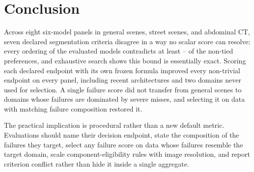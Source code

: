 \section{Conclusion}

Across eight six-model panels in general scenes, street scenes, and abdominal
CT, seven declared segmentation criteria disagree in a way no scalar score can
resolve: every ordering of the evaluated models contradicts at least
\NBAllMin{}--\NBAllMax{} of the non-tied preferences, and exhaustive search shows
this bound is essentially exact. Scoring each declared endpoint with its own
frozen formula improved every non-trivial endpoint on every panel, including
recent architectures and two domains never used for selection. A single
failure score did not transfer from general scenes to domains whose failures
are dominated by severe misses, and selecting it on data with matching failure
composition restored it.

The practical implication is procedural rather than a new default metric.
Evaluations should name their decision endpoint, state the composition of the
failures they target, select any failure score on data whose failures resemble
the target domain, scale component-eligibility rules with image resolution,
and report criterion conflict rather than hide it inside a single aggregate.
